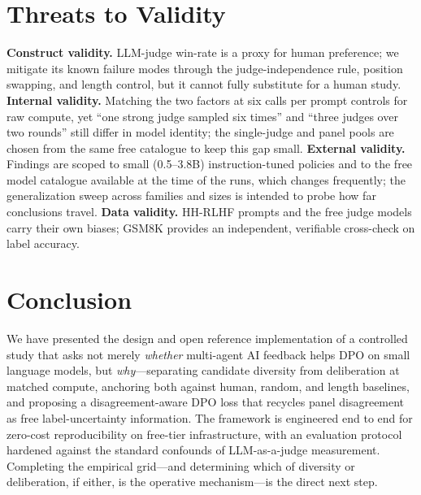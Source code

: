 \documentclass[conference]{IEEEtran}
\begin{document}
\section{Threats to Validity}
\textbf{Construct validity.} LLM-judge win-rate is a proxy for human preference;
we mitigate its known failure modes through the judge-independence rule, position
swapping, and length control, but it cannot fully substitute for a human study.
\textbf{Internal validity.} Matching the two factors at six calls per prompt
controls for raw compute, yet ``one strong judge sampled six times'' and ``three
judges over two rounds'' still differ in model identity; the single-judge and
panel pools are chosen from the same free catalogue to keep this gap small.
\textbf{External validity.} Findings are scoped to small (0.5--3.8B) instruction-tuned
policies and to the free model catalogue available at the time of the runs, which
changes frequently; the generalization sweep across families and sizes is intended
to probe how far conclusions travel. \textbf{Data validity.} HH-RLHF prompts and
the free judge models carry their own biases; GSM8K provides an independent,
verifiable cross-check on label accuracy.

\section{Conclusion}
We have presented the design and open reference implementation of a controlled
study that asks not merely \emph{whether} multi-agent AI feedback helps DPO on
small language models, but \emph{why}---separating candidate diversity from
deliberation at matched compute, anchoring both against human, random, and
length baselines, and proposing a disagreement-aware DPO loss that recycles panel
disagreement as free label-uncertainty information. The framework is engineered
end to end for zero-cost reproducibility on free-tier infrastructure, with an
evaluation protocol hardened against the standard confounds of LLM-as-a-judge
measurement. Completing the empirical grid---and determining which of diversity or
deliberation, if either, is the operative mechanism---is the direct next step.
\end{document}
